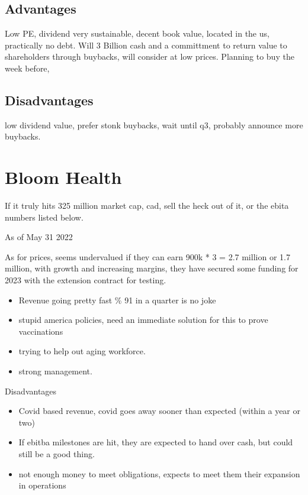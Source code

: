 \subsection{Advantages}

Low PE, dividend very sustainable, decent book value, located in the us, practically no debt. Will 3 Billion cash and a committment to return value to shareholders through buybacks, will consider at low prices.
Planning to buy the week before, 

\subsection{Disadvantages}
low dividend value, prefer stonk buybacks, wait until q3, probably announce more buybacks.

\section{Bloom Health}


If it truly hits 325 million market cap, cad, sell the heck out of it, or the ebita numbers listed below.

As of May 31 2022

As for prices, seems undervalued if they can earn 900k * 3 = 2.7 million or 1.7 million,  with growth and increasing margins, they have secured some funding for 2023 with the extension contract for testing.

\begin{itemize}
    \item Revenue going pretty fast \% 91 in a quarter is no joke
    \item stupid america policies, need an immediate solution for this to prove vaccinations
    \item trying to help out aging workforce.
    \item strong management.
\end{itemize}

Disadvantages

\begin{itemize}
    \item Covid based revenue, covid goes away sooner than expected (within a year or two)
    \item If ebitba milestones are hit, they are expected to hand over cash, but could still be a good thing.
    \item not enough money to meet obligations, expects to meet them their expansion in operations
\end{itemize}

